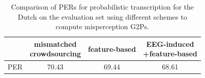 \begin{table}
\begin{center}
\begin{tabular}{|c|c|c|c|}
\hline
  & \specialcell{mismatched \\ crowdsourcing} & feature-based & \specialcell{EEG-induced\\+feature-based} \\
\hline
PER & 70.43 & 69.44 & 68.61 \\
\hline
\end{tabular}
\caption{\label{tbl:eegresults} Comparison of PERs for probabilistic transcription for the Dutch on the evaluation set using different schemes to compute misperception G2Ps.}
\end{center}
\end{table}


